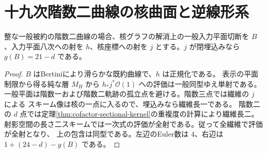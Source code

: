 \section{十九次階数二曲線の核曲面と逆線形系}
\label{sec:cofactor-nineteen-surface}
\begin{lemma}\label{lem:cofactor-plane-evaluation}
整な一般被約の階数二曲線の場合、核グラフの解消上の一般入力平面切断を $B$、入力平面八次への射を
$h$、核座標への射を $j$ とする。$j$ が閉埋込みなら
$g(B)=21-d$ である。
\end{lemma}
\begin{proof}
$B$ はBertiniにより滑らかな既約曲線で、$h$ は正規化である。
表示の平面制限から得る純な層 $M_H$ から $h_*j^*\mathcal O(1)$ への評価は一般同型ゆえ単射である。
一般平面は階数一および階数二軌跡の孤立点を避ける。階数三点では繊維の $j$ による
スキーム像は核の一点に入るので、埋込みなら繊維長一である。
階数二の $d$ 点では定理\ref{thm:cofactor-sectional-kernel}の重複度の計算により繊維長二。
射影空間の長さ二スキームでは一次式の評価が全射である。従って全繊維で評価が全射となり、
上の包含は同型である。左辺のEuler数は $4$、右辺は $1+(24-d)-g(B)$ である。
\end{proof}

